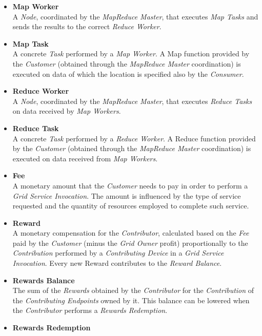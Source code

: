\begin{itemize}
    \item \textbf{Map Worker}\label{map_worker}\\
    A \textit{Node}, coordinated by the \textit{MapReduce Master}, that executes \textit{Map Tasks} and sends the results to the correct \textit{Reduce Worker}.
    \item \textbf{Map Task}\label{map_task}\\
    A concrete \textit{Task} performed by a \textit{Map Worker}. A Map function provided by the \textit{Customer} (obtained through the \textit{MapReduce Master} coordination) is executed on data of which the location is specified also by the \textit{Consumer}.
    \item \textbf{Reduce Worker}\label{reduce_worker}\\
    A \textit{Node}, coordinated by the \textit{MapReduce Master}, that executes \textit{Reduce Tasks} on data received by \textit{Map Workers}.
    \item \textbf{Reduce Task}\label{reduce_task}\\
    A concrete \textit{Task} performed by a \textit{Reduce Worker}. A Reduce function provided by the \textit{Customer} (obtained through the \textit{MapReduce Master} coordination) is executed on data received from \textit{Map Workers}.
    \item \textbf{Fee}\label{fee}\\
    A monetary amount that the \textit{Customer} needs to pay in order to perform a \textit{Grid Service Invocation}. The amount is influenced by the type of service requested and the quantity of resources employed to complete such service.
    \item \textbf{Reward}\label{reward}\\
    A monetary compensation for the \textit{Contributor}, calculated based on the \textit{Fee} paid by the \textit{Customer} (minus the \textit{Grid Owner} profit) proportionally to the \textit{Contribution} performed by a \textit{Contributing Device} in a \textit{Grid Service Invocation}. Every new Reward contributes to the \textit{Reward Balance}.
    \item \textbf{Rewards Balance}\label{rewards_balance}\\
    The sum of the \textit{Rewards} obtained by the \textit{Contributor} for the \textit{Contribution} of the \textit{Contributing Endpoints} owned by it. This balance can be lowered when the \textit{Contributor} performs a \textit{Rewards Redemption}. 
    \item \textbf{Rewards Redemption}\label{rewards_redemption}\\

\end{itemize}
